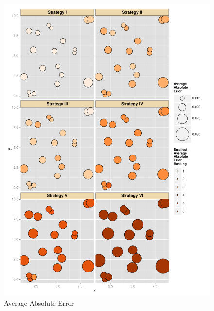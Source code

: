 \documentclass[xetex]{beamer}
\begin{document}
\begin{frame}[plain]
\begin{columns}
			\begin{column}[t]{.5\textwidth}			
				\begin{figure}
					\caption{Average Absolute Error}
					\includegraphics[height=.9\textheight, keepaspectratio]{./picts/ggplotAverageAbsoluteError}
				\end{figure}	
			\end{column}
		\end{columns}
	
	\end{frame}

\end{document}

